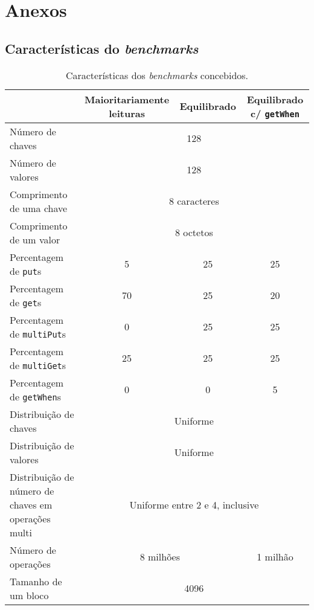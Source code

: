 \documentclass[11pt, a4paper]{article}
\begin{document}
\section{Anexos}

\subsection{Características do \emph{benchmarks}}
\label{benckmark-description}

\begin{table}[H]
    \begin{center}
        \begin{tabular}{|p{5cm}|c|c|c|}
            \hline & Maioritariamente leituras & Equilibrado & Equilibrado c/ \texttt{getWhen} \\

            \hline Número de chaves         & \multicolumn{3}{c|}{128}          \\
            \hline Número de valores        & \multicolumn{3}{c|}{128}          \\
            \hline Comprimento de uma chave & \multicolumn{3}{c|}{8 caracteres} \\
            \hline Comprimento de um valor  & \multicolumn{3}{c|}{8 octetos}    \\

            \hline Percentagem de \texttt{put}s      & 5  & 25 & 25 \\
            \hline Percentagem de \texttt{get}s      & 70 & 25 & 20 \\
            \hline Percentagem de \texttt{multiPut}s & 0  & 25 & 25 \\
            \hline Percentagem de \texttt{multiGet}s & 25 & 25 & 25 \\
            \hline Percentagem de \texttt{getWhen}s  & 0  & 0  & 5  \\

            \hline Distribuição de chaves  & \multicolumn{3}{c|}{Uniforme} \\
            \hline Distribuição de valores & \multicolumn{3}{c|}{Uniforme} \\
            \hline Distribuição de número de chaves em operações multi &
                \multicolumn{3}{c|}{Uniforme entre 2 e 4, inclusive} \\

            \hline Número de operações & \multicolumn{2}{c|}{8 milhões} & 1 milhão\footnotemark \\
            \hline Tamanho de um bloco & \multicolumn{3}{c|}{4096} \\
            \hline
        \end{tabular}
    \end{center}

    \caption{Características dos \emph{benchmarks} concebidos.}
\end{table}
\end{document}

